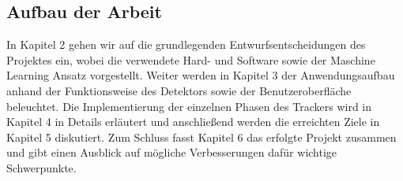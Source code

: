\subsection*{Aufbau der Arbeit}
In Kapitel 2 gehen wir auf die grundlegenden Entwurfsentscheidungen des Projektes ein, wobei die verwendete Hard- und Software sowie der Maschine Learning Ansatz vorgestellt. Weiter werden in Kapitel 3 der Anwendungsaufbau anhand der Funktionsweise des Detektors sowie der Benutzeroberfläche beleuchtet. Die Implementierung der einzelnen Phasen des Trackers wird in Kapitel 4 in Details erläutert und anschließend werden die erreichten Ziele in Kapitel 5 diskutiert. Zum Schluss fasst Kapitel 6 das erfolgte Projekt zusammen und gibt einen Ausblick auf mögliche Verbesserungen dafür wichtige Schwerpunkte.